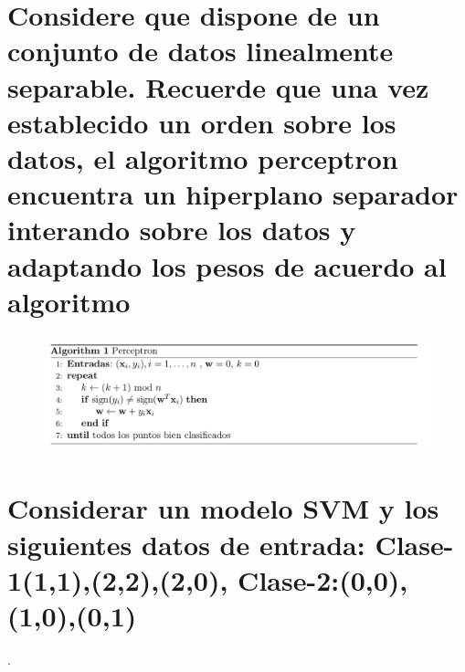 \documentclass[titlepage]{article}
\begin{document}
\section{Considere que dispone de un conjunto de datos linealmente separable. Recuerde que una vez establecido un orden sobre los datos, el algoritmo perceptron encuentra un hiperplano separador interando sobre los datos y adaptando los pesos de acuerdo al algoritmo}
\begin{figure}[H]
	\centering
	\includegraphics[width=1\linewidth]{screenshot005}
	\caption{}
	\label{fig:screenshot005}
\end{figure}
\newpage
\section{Considerar un modelo SVM y los siguientes datos de entrada: Clase-1{(1,1),(2,2),(2,0)}, Clase-2:{(0,0),(1,0),(0,1)}}.
\end{document}

